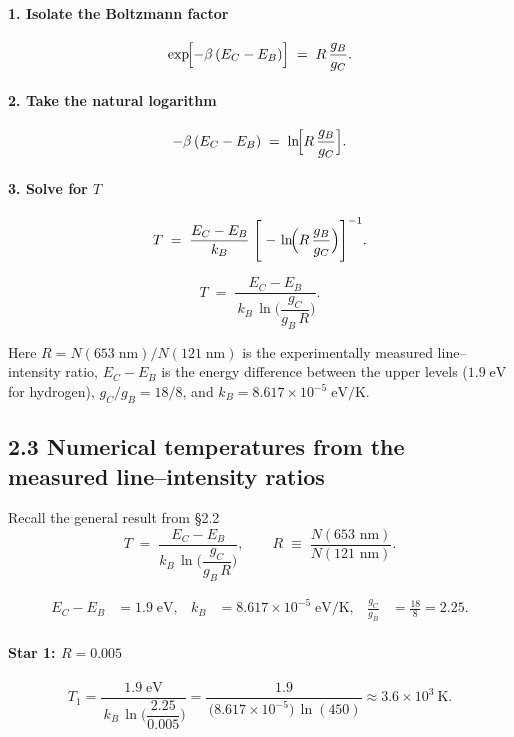 \documentclass[12pt]{article}
\theoremstyle{definition} %
\theoremstyle{plain} %
\begin{document}
\paragraph{1.  Isolate the Boltzmann factor}

\[
   \exp\!\Bigl[-\beta\,(E_C-E_B)\Bigr]
   \;=\;
   R\,\frac{g_B}{g_C}.
\]

\paragraph{2.  Take the natural logarithm}

\[
   -\beta\,(E_C-E_B)
   \;=\;
   \ln\!\Bigl[R\,\dfrac{g_B}{g_C}\Bigr].
\]

\paragraph{3.  Solve for \(T\)}

\[
   T
   \;=\;
   \frac{E_C-E_B}{k_B}\;
   \Biggl[\;
     -\,\ln\!\Bigl(R\,\dfrac{g_B}{g_C}\Bigr)
   \Biggr]^{-1}.
\]

\[
   \boxed{
     \displaystyle 
     T
     \;=\;
     \frac{E_C-E_B}{\,k_B\,\ln\!\bigl(\dfrac{g_C}{g_B\,R}\bigr)}
   }.
\]

\noindent
Here
\(
   R = N(653\;\text{nm})/N(121\;\text{nm})
\)
is the experimentally measured line–intensity ratio,
\(E_C-E_B\) is the energy difference between the upper levels
(\(1.9\;\text{eV}\) for hydrogen), \(g_C/g_B=18/8\), and
\(k_B = 8.617\times10^{-5}\;\text{eV/K}\).
\subsection*{2.3  Numerical temperatures from the measured line–intensity ratios}

Recall the general result from §2.2
\[
   T \;=\;
   \frac{E_C-E_B}{k_B\,\ln\!\bigl(\dfrac{g_C}{g_B\,R}\bigr)},
   \qquad
   R \;\equiv\; \frac{N(653\text{ nm})}{N(121\text{ nm})}.
\]

\[
  \begin{aligned}
    E_C-E_B &= 1.9\;\text{eV}, &
    k_B &= 8.617\times10^{-5}\;\text{eV/K}, &
    \frac{g_C}{g_B} &= \frac{18}{8} = 2.25 .
  \end{aligned}
\]

\paragraph{Star 1: \(R = 0.005\)}

\[
  T_1
  = \frac{1.9\;\text{eV}}
         {\,k_B\,\ln\!\bigl(\dfrac{2.25}{0.005}\bigr)}
  = \frac{1.9}
         {\,\bigl(8.617\times10^{-5}\bigr)\,
            \ln(450)}
  \approx \boxed{3.6\times10^{3}\ \text{K}}.
\]
\end{document}
